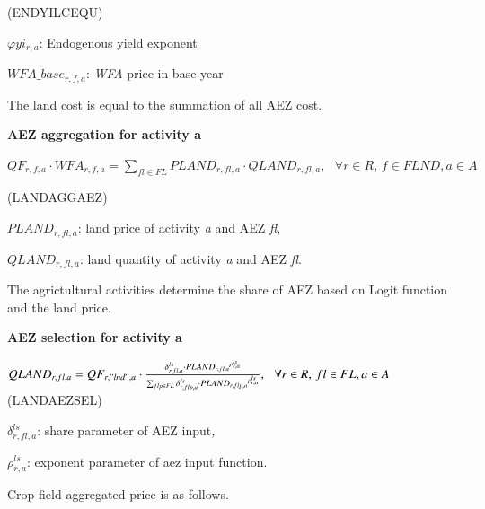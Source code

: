 \documentclass[10pt,a4paper,titlepage,dvipdfmx]{book}
\begin{document}
\begin{flushright}(ENDYILCEQU)\end{flushright}

\begin{flushleft}
$\varphi yi_{r,a}$: Endogenous yield exponent

$WFA\_ base _{r,f,a}$: \textit{WFA} price in base year
\end{flushleft}

     The land cost is equal to the summation of all AEZ cost.

\begin{flushleft}\textbf{AEZ aggregation for activity a }\end{flushleft}


\begin{center}$QF_{r,f,a}\cdot WFA_{r,f,a}=\sum _{fl\in FL}PLAND_{r,fl,a}\cdot QLAND_{r,fl,a},\,\,\,\,\forall r\in R,\,f\in FLND,a\in A$ 
\end{center}

\begin{flushright}(LANDAGGAEZ) \end{flushright}

\begin{flushleft}
$PLAND_{r,fl,a}$: land price of activity \textit{a} and AEZ \textit{fl},

$QLAND_{r,fl,a}$: land quantity of activity \textit{a} and AEZ \textit{fl}.
\end{flushleft}

The agrictultural activities determine the share of AEZ based on Logit function and the land price.

\begin{flushleft}\textbf{AEZ selection for activity a}\end{flushleft}


\begin{center}$QLAND_{r,fl,a}=QF_{r,"lnd",a}\cdot \frac{\delta _{r,fl,a}^{ls}\cdot PLAN{D_{r,fl,a}}^{\rho _{r,a}^{ls}}}{\sum _{flp\in FL}\delta _{r,flp,a}^{ls}\cdot PLAN{D_{r,flp,a}}^{\rho _{r,a}^{ls}}},\,\,\,\,\forall r\in R,\,fl\in FL,a\in A$ (LANDAEZSEL)
\end{center}

\begin{flushleft}
$\delta _{r,fl,a}^{ls}$: share parameter of AEZ input\textit{,}

$\rho _{r,a}^{ls}$: exponent parameter of aez input function.
\end{flushleft}

Crop field aggregated price is as follows.
\end{document}
